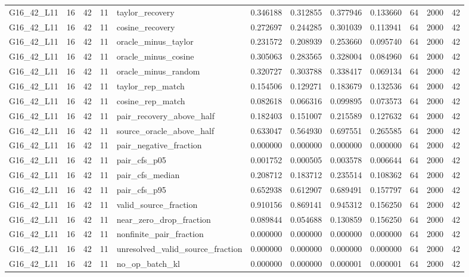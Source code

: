\begin{tabular}{lrlrlrrrrrrr}
G16_42_L11 & 16 & 42 & 11 & taylor_recovery & 0.346188 & 0.312855 & 0.377946 & 0.133660 & 64 & 2000 & 42 \\
G16_42_L11 & 16 & 42 & 11 & cosine_recovery & 0.272697 & 0.244285 & 0.301039 & 0.113941 & 64 & 2000 & 42 \\
G16_42_L11 & 16 & 42 & 11 & oracle_minus_taylor & 0.231572 & 0.208939 & 0.253660 & 0.095740 & 64 & 2000 & 42 \\
G16_42_L11 & 16 & 42 & 11 & oracle_minus_cosine & 0.305063 & 0.283565 & 0.328004 & 0.084960 & 64 & 2000 & 42 \\
G16_42_L11 & 16 & 42 & 11 & oracle_minus_random & 0.320727 & 0.303788 & 0.338417 & 0.069134 & 64 & 2000 & 42 \\
G16_42_L11 & 16 & 42 & 11 & taylor_rep_match & 0.154506 & 0.129271 & 0.183679 & 0.132536 & 64 & 2000 & 42 \\
G16_42_L11 & 16 & 42 & 11 & cosine_rep_match & 0.082618 & 0.066316 & 0.099895 & 0.073573 & 64 & 2000 & 42 \\
G16_42_L11 & 16 & 42 & 11 & pair_recovery_above_half & 0.182403 & 0.151007 & 0.215589 & 0.127632 & 64 & 2000 & 42 \\
G16_42_L11 & 16 & 42 & 11 & source_oracle_above_half & 0.633047 & 0.564930 & 0.697551 & 0.265585 & 64 & 2000 & 42 \\
G16_42_L11 & 16 & 42 & 11 & pair_negative_fraction & 0.000000 & 0.000000 & 0.000000 & 0.000000 & 64 & 2000 & 42 \\
G16_42_L11 & 16 & 42 & 11 & pair_cfs_p05 & 0.001752 & 0.000505 & 0.003578 & 0.006644 & 64 & 2000 & 42 \\
G16_42_L11 & 16 & 42 & 11 & pair_cfs_median & 0.208712 & 0.183712 & 0.235514 & 0.108362 & 64 & 2000 & 42 \\
G16_42_L11 & 16 & 42 & 11 & pair_cfs_p95 & 0.652938 & 0.612907 & 0.689491 & 0.157797 & 64 & 2000 & 42 \\
G16_42_L11 & 16 & 42 & 11 & valid_source_fraction & 0.910156 & 0.869141 & 0.945312 & 0.156250 & 64 & 2000 & 42 \\
G16_42_L11 & 16 & 42 & 11 & near_zero_drop_fraction & 0.089844 & 0.054688 & 0.130859 & 0.156250 & 64 & 2000 & 42 \\
G16_42_L11 & 16 & 42 & 11 & nonfinite_pair_fraction & 0.000000 & 0.000000 & 0.000000 & 0.000000 & 64 & 2000 & 42 \\
G16_42_L11 & 16 & 42 & 11 & unresolved_valid_source_fraction & 0.000000 & 0.000000 & 0.000000 & 0.000000 & 64 & 2000 & 42 \\
G16_42_L11 & 16 & 42 & 11 & no_op_batch_kl & 0.000000 & 0.000000 & 0.000001 & 0.000001 & 64 & 2000 & 42 \\

\end{tabular}
